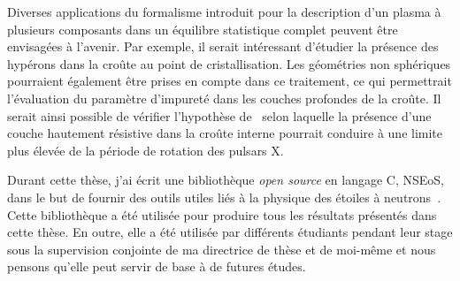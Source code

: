 Diverses applications du formalisme introduit pour la description d'un plasma à
plusieurs composants dans un équilibre statistique complet peuvent être 
envisagées à l'avenir. 
Par exemple, il serait intéressant d'étudier la présence des hypérons dans la 
croûte au point de cristallisation. 
Les géométries non sphériques pourraient également être prises en compte dans 
ce traitement, ce qui permettrait l'évaluation du paramètre d'impureté dans les 
couches profondes de la croûte. Il serait ainsi possible de vérifier 
l'hypothèse de~\cite{Pons2013} selon laquelle la présence d'une couche 
hautement résistive dans la croûte interne pourrait conduire à une limite plus 
élevée de la période de rotation des pulsars X.

Durant cette thèse, j'ai écrit une bibliothèque \textit{open source} en 
langage C, NSEoS, dans le but de fournir des outils utiles liés à la physique 
des étoiles à neutrons~\cite{NSEoS}. Cette bibliothèque a été utilisée pour 
produire tous les résultats présentés dans cette thèse. 
En outre, elle a été utilisée par différents étudiants pendant leur stage 
sous la supervision conjointe de ma directrice de thèse et de moi-même et 
nous pensons qu'elle peut servir de base à de futures études.

